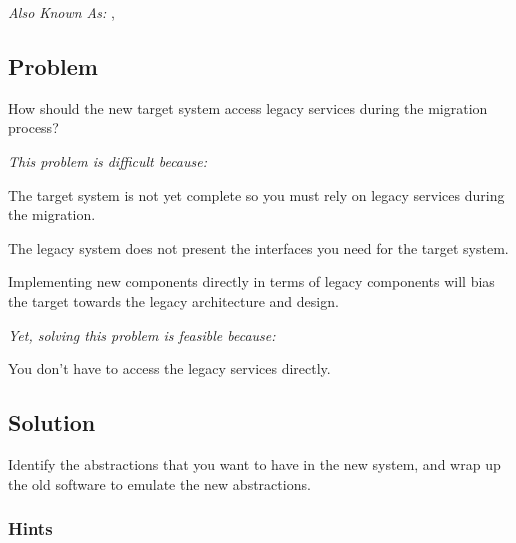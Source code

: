 \documentclass[a4paper,10pt,twoside]{book}
\begin{document}

\emph{Also Known As:}   \cite{Ocal00a},  \cite{Foot00a}


\subsection*{Problem}

How should the new target system access legacy services during the migration process?

\emph{This problem is difficult because:} 

\begin{bulletlist}
\item The target system is not yet complete so you must rely on legacy services during the migration. 

\item The legacy system does not present the interfaces you need for the target system.

\item Implementing new components directly in terms of legacy components will bias the target towards the legacy architecture and design.
\end{bulletlist}

\emph{Yet, solving this problem is feasible because:}

\begin{bulletlist}
\item You don't have to access the legacy services directly.
\end{bulletlist}

\subsection*{Solution}

Identify the abstractions that you want to have in the new system, and wrap up the old software to emulate the new abstractions.

\subsubsection*{Hints}
\end{document}
